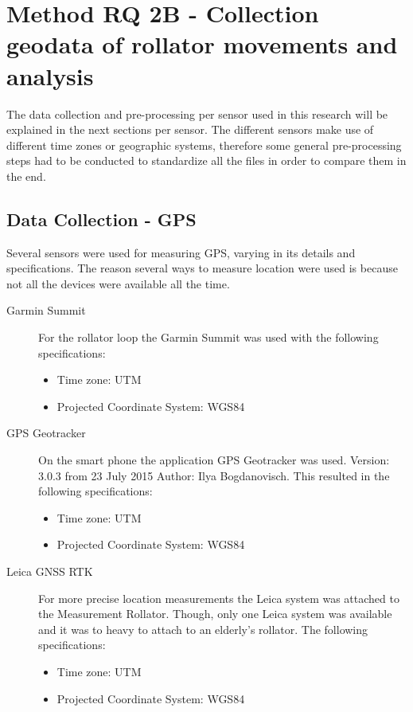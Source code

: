 \section{Method RQ 2B - Collection geodata of rollator movements and analysis}
The data collection and pre-processing per sensor used in this research will be explained in the next sections per sensor. The different sensors make use of different time zones or geographic systems, therefore some general pre-processing steps had to be conducted to standardize all the files in order to compare them in the end. 

\subsection{Data Collection - GPS }
Several sensors were used for measuring GPS, varying in its details and specifications. The reason several ways to measure location were used is because not all the devices were available all the time. 

\begin{description} 
\item[Garmin Summit]
For the rollator loop the Garmin Summit was used with the following specifications:
\begin{itemize}
\item Time zone: UTM
\item Projected Coordinate System: WGS84
\end{itemize}
\end{description}

\begin{description}
\item[GPS Geotracker ]
On the smart phone the application GPS Geotracker was used. Version: 3.0.3 from 23 July 2015 Author: Ilya Bogdanovisch. This resulted in the following specifications:
\begin{itemize}
\item Time zone: UTM
\item Projected Coordinate System: WGS84
\end{itemize}
\end{description}

\begin{description}
\item[Leica GNSS RTK]
For more precise location measurements the Leica system was attached to the Measurement Rollator. Though, only one Leica system was available and it was to heavy to attach to an elderly's rollator. The following specifications:
\begin{itemize}
\item Time zone: UTM
\item Projected Coordinate System: WGS84
\end{itemize}
\end{description}

